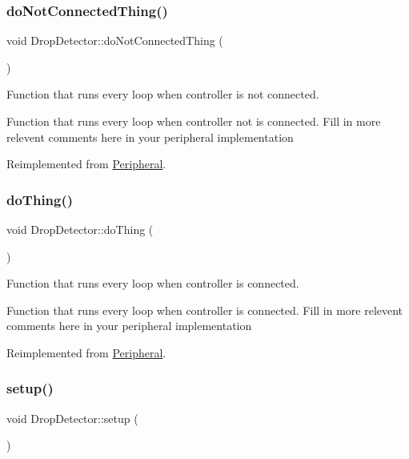 \subsubsection{\texorpdfstring{do\+Not\+Connected\+Thing()}{doNotConnectedThing()}}
{\footnotesize\ttfamily void Drop\+Detector\+::do\+Not\+Connected\+Thing (\begin{DoxyParamCaption}{ }\end{DoxyParamCaption})\hspace{0.3cm}{\ttfamily [virtual]}}



Function that runs every loop when controller is not connected. 

Function that runs every loop when controller not is connected. Fill in more relevent comments here in your peripheral implementation 

Reimplemented from \mbox{\hyperlink{class_peripheral_a331e23603fba1cebb2d4745d46ed2bfe}{Peripheral}}.

\mbox{\label{class_drop_detector_afb6516b60179f581efb76781a6a6f8f2}} 
\subsubsection{\texorpdfstring{do\+Thing()}{doThing()}}
{\footnotesize\ttfamily void Drop\+Detector\+::do\+Thing (\begin{DoxyParamCaption}{ }\end{DoxyParamCaption})\hspace{0.3cm}{\ttfamily [virtual]}}



Function that runs every loop when controller is connected. 

Function that runs every loop when controller is connected. Fill in more relevent comments here in your peripheral implementation 

Reimplemented from \mbox{\hyperlink{class_peripheral_a8643ea34b0c89019aeff10b0d2667e46}{Peripheral}}.

\mbox{\label{class_drop_detector_a067472af2a6852f694d61a6a53b9843e}} 
\subsubsection{\texorpdfstring{setup()}{setup()}}
{\footnotesize\ttfamily void Drop\+Detector\+::setup (\begin{DoxyParamCaption}{ }\end{DoxyParamCaption})\hspace{0.3cm}{\ttfamily [virtual]}}




